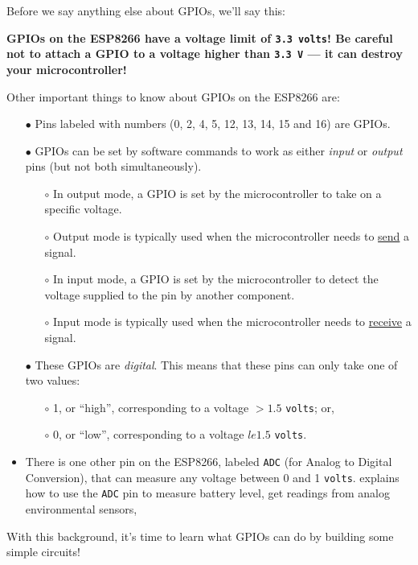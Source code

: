 Before we say anything else about GPIOs, we'll say this: 

\color{red} \textbf{GPIOs on the ESP8266 have a voltage limit of \texttt{3.3 volts}! Be careful not to attach a GPIO to a voltage higher than \texttt{3.3 V} --- it can destroy your microcontroller!} \color{black}

Other important things to know about GPIOs on the ESP8266 are:
\begin{itemize}
	\item[$\bullet$] Pins labeled with numbers (0, 2, 4, 5, 12, 13, 14, 15 and 16) are GPIOs.
	\item[$\bullet$] GPIOs can be set by software commands to work as either \emph{input} or \emph{output} pins (but not both simultaneously).
	 \begin{itemize}
		\item[$\circ$] In output mode, a GPIO is set by the microcontroller to take on a specific voltage. 
		\item[$\circ$] Output mode is typically used when the microcontroller needs to \underline{send} a signal.
		\item[$\circ$] In input mode, a GPIO is set by the microcontroller to detect the voltage supplied to the pin by another component. 
		\item[$\circ$] Input mode is typically used when the microcontroller needs to \underline{receive} a signal.
	\end{itemize}
	\item[$\bullet$] These GPIOs are \emph{digital}. This means that these pins can only take one of two values:
	 \begin{itemize}
	 	\item[$\circ$] 1, or ``high'', corresponding to a voltage $> 1.5$ \texttt{volts}; or,
	 	\item[$\circ$] 0, or ``low'', corresponding to a voltage $le 1.5$ \texttt{volts}.
	\end{itemize}
	\item There is one other pin on the ESP8266, labeled \texttt{ADC} (for Analog to Digital Conversion), that can measure any voltage between 0  and 1 \texttt{volts}.  explains how to use the \texttt{ADC} pin to measure battery level, get readings from analog environmental sensors, \etc
\end{itemize} 
With this background, it's time to learn what GPIOs can do by building some simple circuits!

